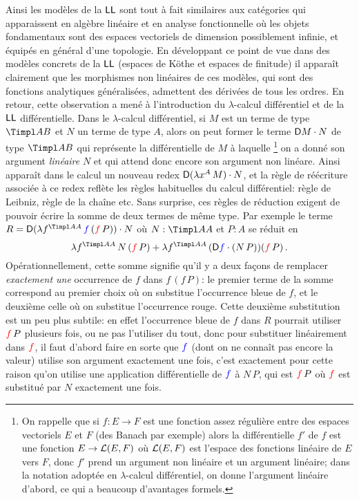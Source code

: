 \documentclass[a4]{article}
\begin{document}
Ainsi les modèles de la $\hbox{\textsf{LL}}$ sont tout à fait similaires aux
catégories qui apparaissent en algèbre linéaire et en analyse
fonctionnelle où les objets fondamentaux sont des espaces vectoriels
de dimension possiblement infinie, et équipés en général d'une
topologie.
%
En développant ce point de vue dans des modèles concrets de la $\hbox{\textsf{LL}}$
(espaces de Köthe et espaces de finitude) il apparaît clairement que
les morphismes non linéaires de ces modèles, qui sont des fonctions
analytiques généralisées, admettent des dérivées de tous les ordres.
%
En retour, cette observation a mené à l'introduction du
$\lambda$-calcul différentiel et de la $\hbox{\textsf{LL}}$ différentielle.
%
Dans le $\lambda$-calcul différentiel, si $M$ est un terme de type
$\Timpl AB$ et $N$ un terme de type $A$, alors on peut former le terme
$\mathsf D{M}\cdot{N}$ de type $\Timpl AB$ qui représente la différentielle de
$M$ à laquelle%
\footnote{On rappelle que si $f:E\to F$ est une fonction assez
  régulière entre des espaces vectoriels $E$ et $F$ (des Banach par
  exemple) alors la différentielle $f'$ de $f$ est une fonction
  $E\to\mathcal{L}(E,F)$ où $\mathcal{L}(E,F)$ est l'espace des fonctions linéaire de
  $E$ vers $F$, donc $f'$ prend un argument non linéaire et un
  argument linéaire; dans la notation adoptée en $\lambda$-calcul
  différentiel, on donne l'argument linéaire d'abord, ce qui a
  beaucoup d'avantages formels.} %
on a donné son argument \emph{linéaire} $N$ et qui attend donc encore
son argument non linéare.
%
Ainsi apparaît dans le calcul un nouveau redex
$\mathsf D{(\lambda x^{A}\,{M})}\cdot{N}$, et la règle de réécriture associée à ce
redex reflète les règles habituelles du calcul différentiel: règle de
Leibniz, règle de la chaîne etc.
%
Sans surprise, ces règles de réduction exigent de pouvoir écrire la
somme de deux termes de même type.
%
Par exemple le terme
$R=\Diffapp{(\Abst f{\Timpl AA}{\BL f\,(\RD f\,P)})}N$ où
$N:\Timpl AA$ et $P:A$ se réduit en
$$
\Abst f{\Timpl AA}{N\,(\RD f\, P)}
+
\Abst f{\Timpl AA}{(\Diffapp{\BL f}{(N\,P)})(\RD f\,P)}\,.
$$
Opérationnellement, cette somme signifie qu'il y a deux façons de
remplacer \emph{exactement une} occurrence de $f$ dans $f\,(f\, P)$: le
premier terme de la somme correspond au premier choix où on substitue
l'occurrence bleue de $f$, et le deuxième celle où on substitue
l'occurrence rouge.
%
Cette deuxième substitution est un peu plus subtile: en effet
l'occurrence bleue de $f$ dans $R$ pourrait utiliser ${\color{red}f}\,P$
plusieurs fois, ou ne pas l'utiliser du tout, donc pour substituer
linéairement dans ${\color{red}f}$, il faut d'abord faire en sorte que ${\color{blue}f}$
(dont on ne connaît pas encore la valeur) utilise son argument
exactement une fois, c'est exactement pour cette raison qu'on utilise
une application différentielle de ${\color{blue}f}$ à $N\,P$, qui est ${\color{red}f}\,P$
où ${\color{red}f}$ est substitué par $N$ exactement une fois.
\end{document}
